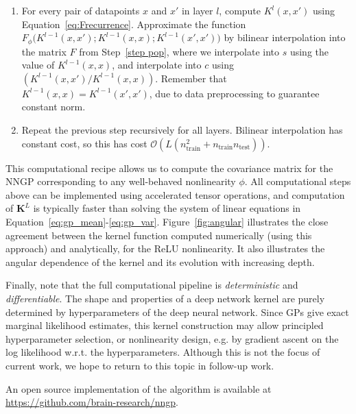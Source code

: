 \documentclass{article} %
\newcommand{\mb}{\mathbf}
\begin{document}
\begin{enumerate}
\begin{align}
{\begin{bmatrix}
                u_a \\ u_b
            \end{bmatrix}
            \right)}
            .
    \end{align}
    \item For every pair of datapoints $x$ and $x'$ in layer $l$, compute $K^l\left(x, x'\right)$ using Equation~\ref{eq:Frecurrence}. Approximate the function $F_{\phi}\bigg(K^{l-1}(x,x'); K^{l-1}(x,x); K^{l-1}(x',x') \bigg)$ by bilinear interpolation into the matrix $F$ from Step~\ref{step pop}, where we interpolate into $s$ using the value of $K^{l-1}(x,x)$, and interpolate into $c$ using $\left(K^{l-1}(x,x') / K^{l-1}(x,x)\right)$. Remember that $K^{l-1}(x,x) = K^{l-1}(x',x')$, due to data preprocessing to guarantee constant norm.
    \item Repeat the previous step recursively for all layers. Bilinear interpolation has constant cost, so this has cost $\mathcal{O}\left( L (n_{\textrm{train}}^2+ n_{\textrm{train}}  n_{\textrm{test}})  \right)$.
\end{enumerate}

This computational recipe allows us to compute the covariance matrix for the NNGP corresponding to any well-behaved nonlinearity $\phi$. All computational steps above can be implemented using accelerated tensor operations, and computation of $\mb K^{L}$ is typically faster than solving the system of linear equations in Equation~\ref{eq:gp_mean}-\ref{eq:gp_var}. Figure~\ref{fig:angular} illustrates the close agreement between the kernel function computed numerically (using this approach) and analytically, for the ReLU nonlinearity. It also illustrates the angular dependence of the kernel and its evolution with increasing depth.

Finally, note that the full computational pipeline is {\em deterministic} and {\em differentiable}. The shape and properties of a deep network kernel are purely determined by hyperparameters of the deep neural network. Since GPs give exact marginal likelihood estimates, this kernel construction may allow principled hyperparameter selection, or nonlinearity design, e.g. by gradient ascent on the log likelihood w.r.t. the hyperparameters. Although this is not the focus of current work, we hope to return to this topic in follow-up work.

An open source implementation of the algorithm is available at \href{https://github.com/brain-research/nngp}{https://github.com/brain-research/nngp}.
\end{document}
